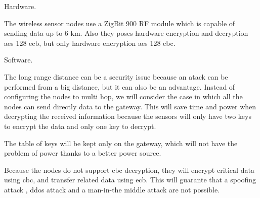 \label{chap:arch}


Hardware.

The wireless sensor nodes use a ZigBit 900 RF module which is capable of sending data up to 6 km. Also they poses hardware encryption and decryption aes 128 ecb, but only hardware encryption aes 128 cbc.

Software.

The long range distance can be a security issue because an atack can be performed from a big distance, but it can also be an advantage. Instead of configuring the nodes to multi hop, we will consider the case in which all the nodes can send directly data to the gateway. This will save time and power when decrypting the received information because the sensors will only have two keys to encrypt the data and only one key to decrypt.

The table of keys will be kept only on the gateway, which will not have the problem of power thanks to a better power source.

Because the nodes do not support cbc decryption, they will encrypt critical data using cbc, and transfer related data using ecb. This will guarante that a spoofing attack , ddos attack and a man-in-the middle attack are not possible.


\cite{shah2014review}


 



